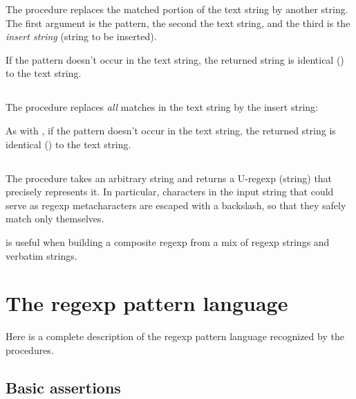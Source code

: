 {The procedure  replaces
the
matched portion of the text string by another
string.  The first argument is the pattern,
the second the text string, and the third
is the {\em insert string} (string to be inserted).


\n If the pattern doesn't occur in the text
string, the returned string is identical ()
to the text string.

\subsection{}

The procedure  replaces
{\em all}
matches in the text string by the insert
string:


\n As with , if the pattern doesn't
occur in the text string, the returned string is
identical () to the text string.

\subsection{}

The procedure  takes
an arbitrary string and returns a U-regexp
(string) that precisely represents it.  In particular,
characters in the input string that could serve as
regexp metacharacters are escaped with a
backslash, so that they safely match only themselves.


 is useful when building a composite
regexp from a mix of regexp strings and verbatim strings.

\section{The regexp pattern language}

Here is a complete description of the regexp pattern
language recognized by the  procedures.

\subsection{Basic assertions}

}
